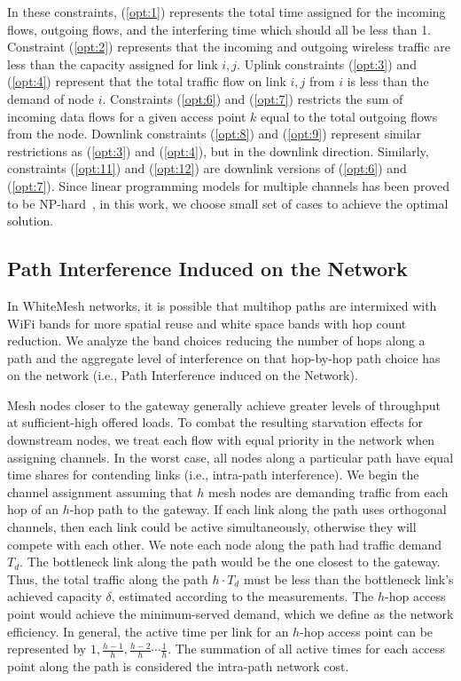 In these constraints, (\ref{opt:1}) represents the total time assigned for the incoming flows, outgoing flows, 
and the interfering time which should all be less than 1. Constraint (\ref{opt:2}) represents that the incoming and 
outgoing wireless traffic are less than the capacity assigned for link $i,j$. Uplink constraints 
(\ref{opt:3}) and (\ref{opt:4}) represent that the total traffic flow on link $i,j$ from $i$ is less than 
the demand of node $i$. Constraints (\ref{opt:6}) and (\ref{opt:7}) restricts the sum of incoming data 
flows for a given access point $k$ equal to the total outgoing flows from the node. Downlink constraints 
(\ref{opt:8}) and (\ref{opt:9}) represent similar restrictions as (\ref{opt:3}) and (\ref{opt:4}), but 
in the downlink direction. Similarly, constraints (\ref{opt:11}) and (\ref{opt:12}) are downlink versions of 
(\ref{opt:6}) and (\ref{opt:7}).
Since linear programming models for multiple channels has been proved to be NP-hard~\cite{yuan2006cross},
in this work, we choose small set of cases to achieve the optimal solution.



%
\subsection{Path Interference Induced on the Network}
\label{subsec:PEN}

In WhiteMesh networks, it is possible that multihop paths are intermixed with WiFi bands for more spatial reuse 
and white space bands with hop count reduction. We analyze the band choices reducing the number of hops along 
a path and the aggregate level of interference on that hop-by-hop path choice has on the network (i.e., Path 
Interference induced on the Network).

Mesh nodes closer to the gateway generally achieve greater levels of throughput at sufficient-high 
offered loads. To combat the resulting starvation effects for downstream nodes, we treat each flow with equal priority in the network 
when assigning channels. In the worst case, all nodes along a particular path have equal time shares for 
contending links (i.e., intra-path interference). We begin the channel assignment assuming that $h$ mesh 
nodes are demanding traffic from each hop of an $h$-hop path to the gateway. If each link along the path 
uses orthogonal channels, then each link could be active simultaneously, otherwise they will compete with 
each other. We note each node along the path had traffic demand $T_d$. The bottleneck link 
along the path would be the one closest to the gateway. Thus, the total traffic along the 
path $h \cdot T_d$ must be less than the bottleneck link's achieved capacity $\delta$, estimated according 
to the measurements. The $h$-hop access point would achieve the minimum-served demand, which we define as the 
network efficiency. In general, the active time per link for an $h$-hop access point can be represented by 
$1,\frac{h-1}{h},\frac{h-2}{h}\cdots \frac{1}{h}$. The summation of all active times for each access point 
along the path is considered the intra-path network cost.


